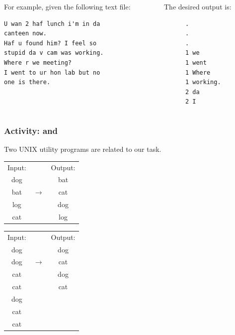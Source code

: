 \begin{frame}[fragile]
\begin{columns}
\begin{column}{0.5\textwidth}
For example, given the following text file:
\begin{verbatim}
U wan 2 haf lunch i'm in da 
canteen now.
Haf u found him? I feel so 
stupid da v cam was working.
Where r we meeting?
I went to ur hon lab but no 
one is there.
\end{verbatim}
\end{column}
\begin{column}{0.5\textwidth}
The desired output is:
\begin{verbatim}
      .
      .
      .
      1 we
      1 went
      1 Where
      1 working.
      2 da
      2 I
\end{verbatim}
\end{column}
\end{columns}
\end{frame}


\begin{frame}[fragile]
\frametitle{Activity:  and }
Two UNIX utility programs are related to our task.  

\begin{block}{}
\begin{tabular}{c c c}
Input: & & Output: \\
dog    & & bat \\
bat    &$\longrightarrow$& cat \\
log    & & dog \\
cat    & & log \\
\end{tabular}
\end{block}

\begin{block}{}
\begin{tabular}{c c c}
Input: & & Output: \\
dog    & & dog \\
dog    &$\longrightarrow$& cat \\
cat    & & dog \\
cat    & & cat \\
dog    & & \\
cat    & & \\
cat    & & \\
\end{tabular}
\end{block}
\end{frame}

